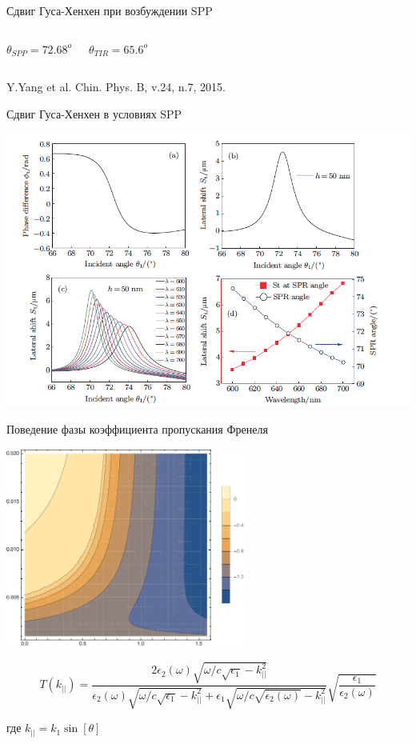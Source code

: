\documentclass[9pt, compress, xcolor=table]{beamer}
\begin{document}
\begin{frame}{Сдвиг Гуса-Хенхен при возбуждении SPP}
\begin{columns}[c]
$\theta_{SPP}=72.68^{o}$

$\theta_{TIR}=65.6^{o}$
\end{columns}
Y.Yang et al. Chin. Phys. B, v.24, n.7, 2015.
\end{frame}

\begin{frame}{Сдвиг Гуса-Хенхен в условиях SPP}
\begin{center}
\includegraphics[width=\textwidth]{gh9}
\end{center}
\end{frame}

\begin{frame}{Поведение фазы коэффициента пропускания Френеля}

\begin{center}
\includegraphics[width=0.6\textwidth]{phase}
\end{center}

\begin{equation*}
T(k_{||})=\frac{2\epsilon_2(\omega)\sqrt{\omega/c\sqrt{\epsilon_1}-k_{||}^2}}{\epsilon_2(\omega)\sqrt{\omega/c\sqrt{\epsilon_1}-k_{||}^2}+\epsilon_1\sqrt{\omega/c\sqrt{\epsilon_2(\omega)}-k_{||}^2}}\sqrt{\frac{\epsilon_1}{\epsilon_2(\omega)}}
\end{equation*}

где $k_{||}=k_1\sin[\theta]$

\end{frame}
\end{document}
